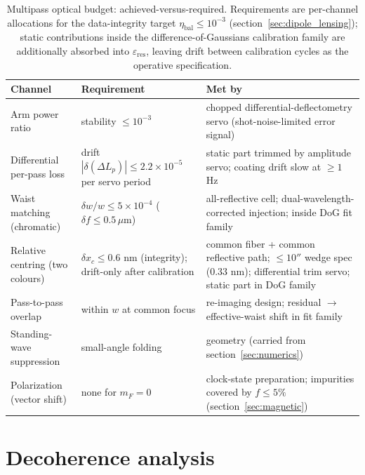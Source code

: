 \documentclass[11pt,a4paper]{article}
\begin{document}
\begin{table}[t]
\centering
\small
\setlength{\tabcolsep}{4pt}
\caption{Multipass optical budget: achieved-versus-required. Requirements are per-channel allocations for the data-integrity target $\eta_\text{bal} \leq 10^{-3}$ (section~\ref{sec:dipole_lensing}); static contributions inside the difference-of-Gaussians calibration family are additionally absorbed into $\varepsilon_\text{res}$, leaving drift between calibration cycles as the operative specification.}
\label{tab:optics_budget}
\begin{tabular}{>{\raggedright\arraybackslash}p{}>{\raggedright\arraybackslash}p{}>{\raggedright\arraybackslash}p{}}
\toprule
\textbf{Channel} & \textbf{Requirement} & \textbf{Met by} \\
\midrule
Arm power ratio & stability $\leq 10^{-3}$ & chopped differential-deflectometry servo (shot-noise-limited error signal) \\
Differential per-pass loss & drift $|\delta(\Delta L_p)| \leq 2.2\times 10^{-5}$ per servo period & static part trimmed by amplitude servo; coating drift slow at $\geq 1$ Hz \\
Waist matching (chromatic) & $\delta w/w \leq 5\times 10^{-4}$ ($\delta f \leq 0.5\,\mu$m) & all-reflective cell; dual-wavelength-corrected injection; inside DoG fit family \\
Relative centring (two colours) & $\delta x_c \leq 0.6$ nm (integrity); drift-only after calibration & common fiber + common reflective path; $\leq 10''$ wedge spec ($0.33$ nm); differential trim servo; static part in DoG family \\
Pass-to-pass overlap & within $w$ at common focus & re-imaging design; residual $\to$ effective-waist shift in fit family \\
Standing-wave suppression & small-angle folding & geometry (carried from section~\ref{sec:numerics}) \\
Polarization (vector shift) & none for $m_F = 0$ & clock-state preparation; impurities covered by $f \leq 5\%$ (section~\ref{sec:magnetic}) \\
\bottomrule
\end{tabular}
\end{table}

\section{Decoherence analysis}
\label{sec:decoherence}
\end{document}
